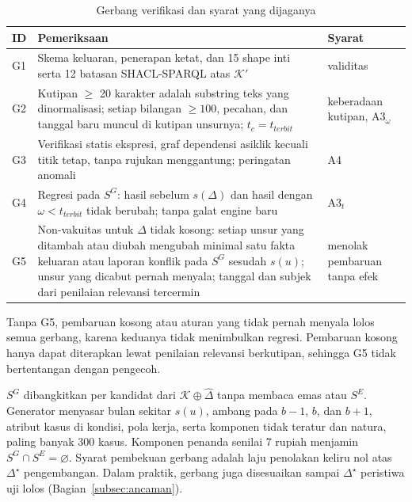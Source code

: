 \documentclass[journal,a4paper]{IEEEtran}
\makeatletter
\DeclareRobustCommand{\en}[1]{{\usefont{\f@encoding}{\f@family}{\f@series}{it}#1\/}}
\newcommand{\K}{\mathcal{K}}
\newcommand{\emas}{\star}
\newcommand{\SG}{S^{G}}
\newcommand{\SE}{S^{E}}
\makeatother
\begin{document}
\begin{table}[t]
\centering
\caption{Gerbang verifikasi dan syarat yang dijaganya}
\label{tab:gerbang}
\scriptsize
\begin{tabularx}{\columnwidth}{@{}P{0.5cm} L P{1.3cm}@{}}
\toprule
\textbf{ID} & \textbf{Pemeriksaan} & \textbf{Syarat} \\
\midrule
G1 & Skema keluaran, penerapan ketat, dan 15 \en{shape} inti serta 12 batasan SHACL-SPARQL atas $\K'$ & validitas \\
G2 & Kutipan $\geq$ 20 karakter adalah \en{substring} teks yang dinormalisasi; setiap bilangan $\geq 100$, pecahan, dan tanggal baru muncul di kutipan unsurnya; $t_c = t_{\mathit{terbit}}$ & keberadaan kutipan, A3$_\omega$ \\
G3 & Verifikasi statis ekspresi, graf dependensi asiklik kecuali titik tetap, tanpa rujukan menggantung; peringatan anomali & A4 \\
G4 & Regresi pada $\SG$: hasil sebelum $s(\Delta)$ dan hasil dengan $\omega < t_{\mathit{terbit}}$ tidak berubah; tanpa galat \en{engine} baru & A3$_t$ \\
G5 & Non-vakuitas untuk $\Delta$ tidak kosong: setiap unsur yang ditambah atau diubah mengubah minimal satu fakta keluaran atau laporan konflik pada $\SG$ sesudah $s(u)$; unsur yang dicabut pernah menyala; tanggal dan subjek dari penilaian relevansi tercermin & menolak pembaruan tanpa efek \\
\bottomrule
\end{tabularx}
\end{table}

Tanpa G5, pembaruan kosong atau aturan yang tidak pernah menyala lolos semua gerbang, karena keduanya tidak menimbulkan regresi. Pembaruan kosong hanya dapat diterapkan lewat penilaian relevansi berkutipan, sehingga G5 tidak bertentangan dengan pengecoh.

$\SG$ dibangkitkan per kandidat dari $\K \oplus \hat{\Delta}$ tanpa membaca emas atau $\SE$. Generator menyasar bulan sekitar $s(u)$, ambang pada $b-1$, $b$, dan $b+1$, atribut kasus di kondisi, pola kerja, serta komponen tidak teratur dan natura, paling banyak 300 kasus. Komponen penanda senilai 7 rupiah menjamin $\SG \cap \SE = \varnothing$. Syarat pembekuan gerbang adalah laju penolakan keliru nol atas $\Delta^{\emas}$ pengembangan. Dalam praktik, gerbang juga disesuaikan sampai $\Delta^{\emas}$ peristiwa uji lolos (Bagian~\ref{subsec:ancaman}).
\end{document}
